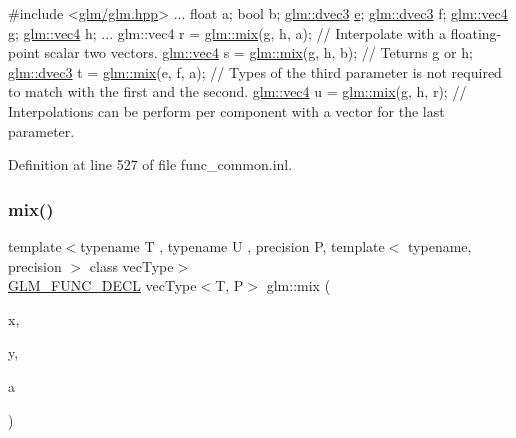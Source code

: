 \begin{DoxyCode}
\textcolor{preprocessor}{#include <\hyperlink{third-party_2include_2glm_2glm_8hpp}{glm/glm.hpp}>}
...
float a;
\textcolor{keywordtype}{bool} b;
\hyperlink{structglm_1_1detail_1_1tvec3}{glm::dvec3} \hyperlink{group__gtc__constants_gab83fb6de0f05d6c0d11bdf0479f8319e}{e};
\hyperlink{structglm_1_1detail_1_1tvec3}{glm::dvec3} f;
\hyperlink{structglm_1_1detail_1_1tvec4}{glm::vec4} g;
\hyperlink{structglm_1_1detail_1_1tvec4}{glm::vec4} h;
...
glm::vec4 r = \hyperlink{group__core__func__common_gadccbaffe46f369cf1a96b2aef92cbfdd}{glm::mix}(g, h, a); \textcolor{comment}{// Interpolate with a floating-point scalar two vectors. }
\hyperlink{structglm_1_1detail_1_1tvec4}{glm::vec4} s = \hyperlink{group__core__func__common_gadccbaffe46f369cf1a96b2aef92cbfdd}{glm::mix}(g, h, b); \textcolor{comment}{// Teturns g or h;}
\hyperlink{structglm_1_1detail_1_1tvec3}{glm::dvec3} t = \hyperlink{group__core__func__common_gadccbaffe46f369cf1a96b2aef92cbfdd}{glm::mix}(e, f, a); \textcolor{comment}{// Types of the third parameter is not required to
       match with the first and the second.}
\hyperlink{structglm_1_1detail_1_1tvec4}{glm::vec4} u = \hyperlink{group__core__func__common_gadccbaffe46f369cf1a96b2aef92cbfdd}{glm::mix}(g, h, r); \textcolor{comment}{// Interpolations can be perform per component with a
       vector for the last parameter.}
\end{DoxyCode}
 

Definition at line 527 of file func\+\_\+common.\+inl.

\mbox{\label{group__core__func__common_gaa5c83ada94113757c0a555ab4f40cd6e}} 
\subsubsection{\texorpdfstring{mix()}{mix()}\hspace{0.1cm}{\footnotesize\ttfamily [2/3]}}
{\footnotesize\ttfamily template$<$typename T , typename U , precision P, template$<$ typename, precision $>$ class vec\+Type$>$ \\
\hyperlink{setup_8hpp_ab2d052de21a70539923e9bcbf6e83a51}{G\+L\+M\+\_\+\+F\+U\+N\+C\+\_\+\+D\+E\+CL} vec\+Type$<$T, P$>$ glm\+::mix (\begin{DoxyParamCaption}\item[{vec\+Type$<$ T, P $>$ const \&}]{x,  }\item[{vec\+Type$<$ T, P $>$ const \&}]{y,  }\item[{U const \&}]{a }\end{DoxyParamCaption})}



